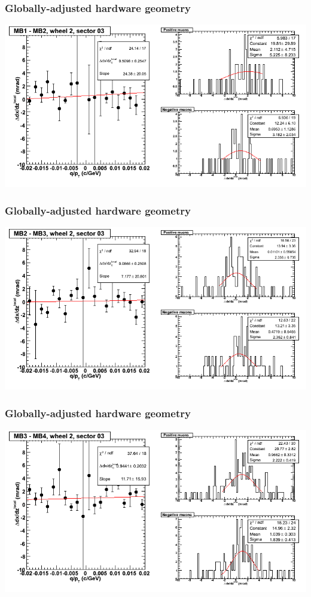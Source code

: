 \documentclass[compress]{beamer}
\begin{document}
\begin{frame}
\frametitle{Globally-adjusted hardware geometry}
\includegraphics[width=\linewidth]{NOV4_segdiffs_HW/dt13_slope_E_03_12.png}
\end{frame}

\begin{frame}
\frametitle{Globally-adjusted hardware geometry}
\includegraphics[width=\linewidth]{NOV4_segdiffs_HW/dt13_slope_E_03_23.png}
\end{frame}

\begin{frame}
\frametitle{Globally-adjusted hardware geometry}
\includegraphics[width=\linewidth]{NOV4_segdiffs_HW/dt13_slope_E_03_34.png}
\end{frame}
\end{document}
